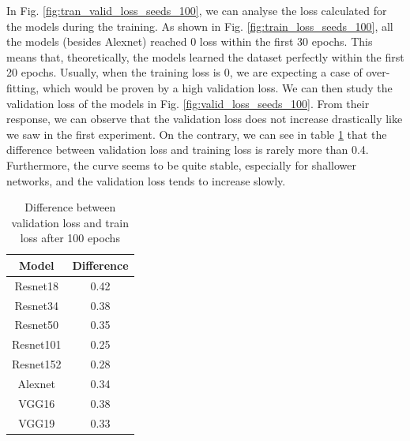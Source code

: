 In Fig. \ref{fig:tran_valid_loss_seeds_100}, we can analyse the loss calculated for the models during the training. As shown in Fig. \ref{fig:train_loss_seeds_100}, all the models (besides Alexnet) reached 0 loss within the first 30 epochs. This means that, theoretically, the models learned the dataset perfectly within the first 20 epochs. Usually, when the training loss is 0, we are expecting a case of over-fitting, which would be proven by a high validation loss. We can then study the validation loss of the models in Fig. \ref{fig:valid_loss_seeds_100}. From their response, we can observe that the validation loss does not increase drastically like we saw in the first experiment. On the contrary, we can see in table \ref{tab:difference_val_tra_loss} that the difference between validation loss and training loss is rarely more than 0.4. Furthermore, the curve seems to be quite stable, especially for shallower networks, and the validation loss tends to increase slowly. 

\begin{table}[h]
\centering
        \begin{tabular}{ c c  }
                 Model&Difference\\
                 \hline
                   Resnet18&0.42\\
                    Resnet34&0.38\\
                    Resnet50&0.35\\
                    Resnet101&0.25\\
                    Resnet152&0.28\\
                    Alexnet&0.34\\
                        VGG16&0.38\\
                    VGG19&0.33\\
                    \end{tabular}
                    \caption{Difference between validation loss and train loss after 100 epochs }                   
                     \label{tab:difference_val_tra_loss}
     \end{table} 


